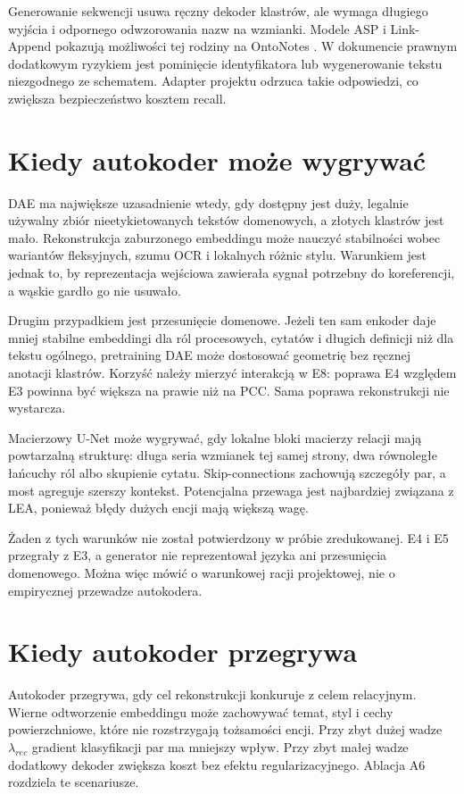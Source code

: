 Generowanie sekwencji usuwa ręczny dekoder klastrów, ale wymaga długiego wyjścia i odpornego odwzorowania nazw na wzmianki. Modele ASP i Link-Append pokazują możliwości tej rodziny na OntoNotes \cite{liu_2022_asp,bohnet_2023_linkappend}. W dokumencie prawnym dodatkowym ryzykiem jest pominięcie identyfikatora lub wygenerowanie tekstu niezgodnego ze schematem. Adapter projektu odrzuca takie odpowiedzi, co zwiększa bezpieczeństwo kosztem recall.

\section{Kiedy autokoder może wygrywać}

DAE ma największe uzasadnienie wtedy, gdy dostępny jest duży, legalnie używalny zbiór nieetykietowanych tekstów domenowych, a złotych klastrów jest mało. Rekonstrukcja zaburzonego embeddingu może nauczyć stabilności wobec wariantów fleksyjnych, szumu OCR i lokalnych różnic stylu. Warunkiem jest jednak to, by reprezentacja wejściowa zawierała sygnał potrzebny do koreferencji, a wąskie gardło go nie usuwało.

Drugim przypadkiem jest przesunięcie domenowe. Jeżeli ten sam enkoder daje mniej stabilne embeddingi dla ról procesowych, cytatów i długich definicji niż dla tekstu ogólnego, pretraining DAE może dostosować geometrię bez ręcznej anotacji klastrów. Korzyść należy mierzyć interakcją w E8: poprawa E4 względem E3 powinna być większa na prawie niż na PCC. Sama poprawa rekonstrukcji nie wystarcza.

Macierzowy U-Net może wygrywać, gdy lokalne bloki macierzy relacji mają powtarzalną strukturę: długa seria wzmianek tej samej strony, dwa równoległe łańcuchy ról albo skupienie cytatu. Skip-connections zachowują szczegóły par, a most agreguje szerszy kontekst. Potencjalna przewaga jest najbardziej związana z LEA, ponieważ błędy dużych encji mają większą wagę.

Żaden z tych warunków nie został potwierdzony w próbie zredukowanej. E4 i E5 przegrały z E3, a generator nie reprezentował języka ani przesunięcia domenowego. Można więc mówić o warunkowej racji projektowej, nie o empirycznej przewadze autokodera.

\section{Kiedy autokoder przegrywa}

Autokoder przegrywa, gdy cel rekonstrukcji konkuruje z celem relacyjnym. Wierne odtworzenie embeddingu może zachowywać temat, styl i cechy powierzchniowe, które nie rozstrzygają tożsamości encji. Przy zbyt dużej wadze $\lambda_{rec}$ gradient klasyfikacji par ma mniejszy wpływ. Przy zbyt małej wadze dodatkowy dekoder zwiększa koszt bez efektu regularizacyjnego. Ablacja A6 rozdziela te scenariusze.

